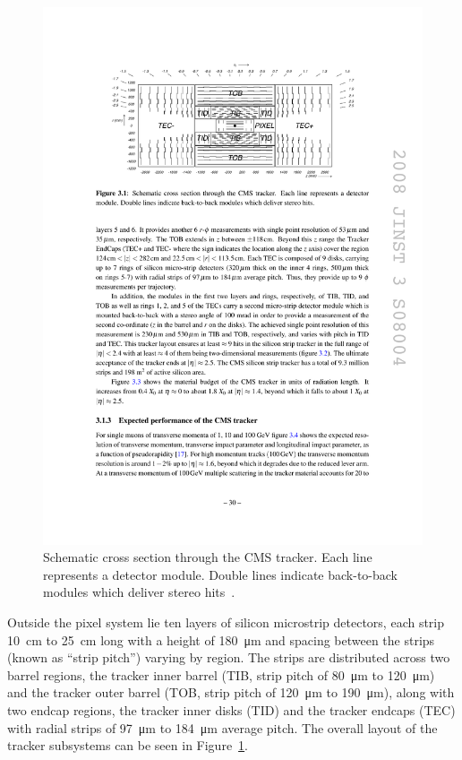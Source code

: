 \begin{figure}
  \centering
  \includegraphics[width=\textwidth]{figures/cms-tracker-xsec}
  \caption[Schematic cross section through the CMS tracker]{Schematic cross section through the CMS tracker.  Each line represents a detector module.  Double lines indicate back-to-back modules which deliver stereo hits~\cite{Evans:1129806}.}
  \label{fig:tracker-xsec}
\end{figure}

Outside the pixel system lie ten layers of silicon microstrip detectors, each strip \SI{10}{cm} to \SI{25}{cm} long with a height of \SI{180}{\micro m} and spacing between the strips (known as ``strip pitch'') varying by region.  The strips are distributed across two barrel regions, the tracker inner barrel (TIB, strip pitch of \SI{80}{\micro m} to \SI{120}{\micro m}) and the tracker outer barrel (TOB, strip pitch of \SI{120}{\micro m} to \SI{190}{\micro m}), along with two endcap regions, the tracker inner disks (TID) and the tracker endcaps (TEC) with radial strips of \SI{97}{\micro m} to \SI{184}{\micro m} average pitch.  The overall layout of the tracker subsystems can be seen in Figure~\ref{fig:tracker-xsec}.

